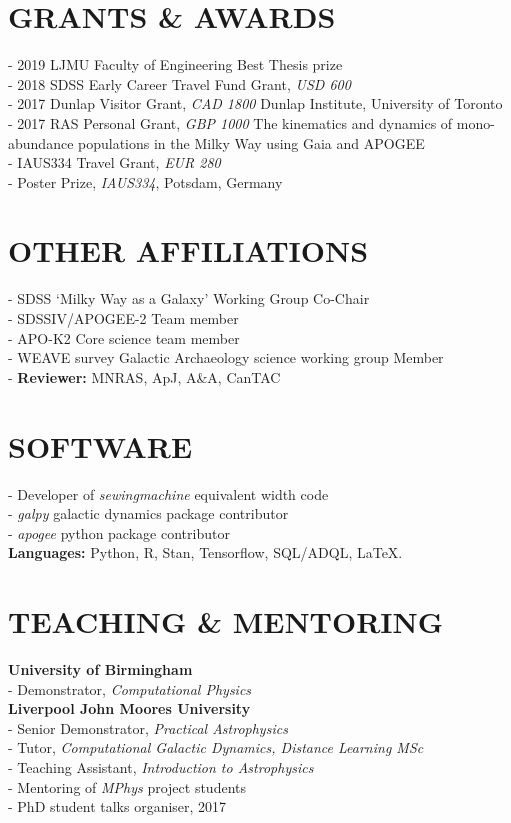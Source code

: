 \documentclass[margin]{res}
\begin{document}
\begin{resume}
\section{GRANTS \& AWARDS}
\par
- 2019 LJMU Faculty of Engineering Best Thesis prize \\
- 2018 SDSS Early Career Travel Fund Grant, \emph{USD 600}\\
-  2017 Dunlap Visitor Grant, \emph{CAD 1800} Dunlap Institute, University of Toronto\\
- 2017 RAS Personal Grant, \emph{GBP 1000} The kinematics and dynamics of mono-abundance populations in the Milky Way using Gaia and APOGEE\\
- IAUS334 Travel Grant, \emph{EUR 280}\\
- Poster Prize, \emph{IAUS334}, Potsdam, Germany\\



\section{OTHER AFFILIATIONS}
\par
- SDSS `Milky Way as a Galaxy' Working Group Co-Chair \\
- SDSSIV/APOGEE-2 Team member\\
- APO-K2 Core science team member\\
- WEAVE survey Galactic Archaeology science working group Member\\
- \textbf{Reviewer:} MNRAS, ApJ, A\&A, CanTAC\\


\section{SOFTWARE}
\par
- Developer of \emph{sewingmachine} equivalent width code\\
- \emph{galpy} galactic dynamics package contributor\\
- \emph{apogee} python package contributor\\
\textbf{Languages:} Python, R, Stan, Tensorflow, SQL/ADQL, \LaTeX.\\

\section{TEACHING \& MENTORING}
\par 
\textbf{University of Birmingham}\\
- Demonstrator, \emph{Computational Physics}\\
\textbf{Liverpool John Moores University}\\
- Senior Demonstrator, \emph{Practical Astrophysics}\\
- Tutor, \emph{Computational Galactic Dynamics, Distance Learning MSc}\\
- Teaching Assistant, \emph{Introduction to Astrophysics}\\
- Mentoring of \emph{MPhys} project students\\
- PhD student talks organiser, 2017


\end{resume}
\end{document}
